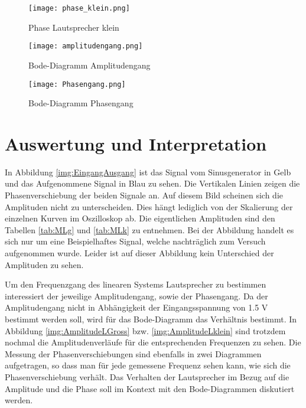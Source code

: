 \begin{figure}[H]
\centering
\texttt{[image: phase\_klein.png]}
\caption{Phase Lautsprecher klein}
\label{img:PhaseKlein}
\end{figure}

\begin{figure}[H]
\centering
\texttt{[image: amplitudengang.png]}
\caption{Bode-Diagramm Amplitudengang}
\label{img:BodeAmplitude}
\end{figure}

\begin{figure}[H]
\centering
\texttt{[image: Phasengang.png]}
\caption{Bode-Diagramm Phasengang}
\label{img:PhasenGang Bode-Diagramm}
\end{figure}


\section{Auswertung und Interpretation}
\label{chap:AUSWERTUNGUNDINTERPRETATION}
In Abbildung \ref{img:EingangAusgang} ist das Signal vom Sinusgenerator in Gelb und das Aufgenommene Signal in Blau zu sehen. Die Vertikalen Linien zeigen die Phasenverschiebung der beiden Signale an. Auf diesem Bild scheinen sich die Amplituden nicht zu unterscheiden. Dies hängt lediglich von der Skalierung der einzelnen Kurven im Oszilloskop ab. Die eigentlichen Amplituden sind den Tabellen \ref{tab:MLg} und \ref{tab:MLk} zu entnehmen. Bei der Abbildung handelt es sich nur um eine Beispielhaftes Signal, welche nachträglich zum Versuch aufgenommen wurde. Leider ist auf dieser Abbildung kein Unterschied der Amplituden zu sehen.

Um den Frequenzgang des linearen Systems Lautsprecher zu bestimmen interessiert der jeweilige Amplitudengang, sowie der Phasengang. Da der Amplitudengang nicht in Abhängigkeit der Eingangsspannung von 1.5 V bestimmt werden soll, wird für das Bode-Diagramm das Verhältnis bestimmt. In Abbildung \ref{img:AmplitudeLGross} bzw. \ref{img:AmplitudeLklein} sind trotzdem nochmal die Amplitudenverläufe für die entsprechenden Frequenzen zu sehen. Die Messung der Phasenverschiebungen sind ebenfalls in zwei Diagrammen aufgetragen, so dass man für jede gemessene Frequenz sehen kann, wie sich die Phasenverschiebung verhält. Das Verhalten der Lautsprecher im Bezug auf die Amplitude und die Phase soll im Kontext mit den Bode-Diagrammen diskutiert werden.

